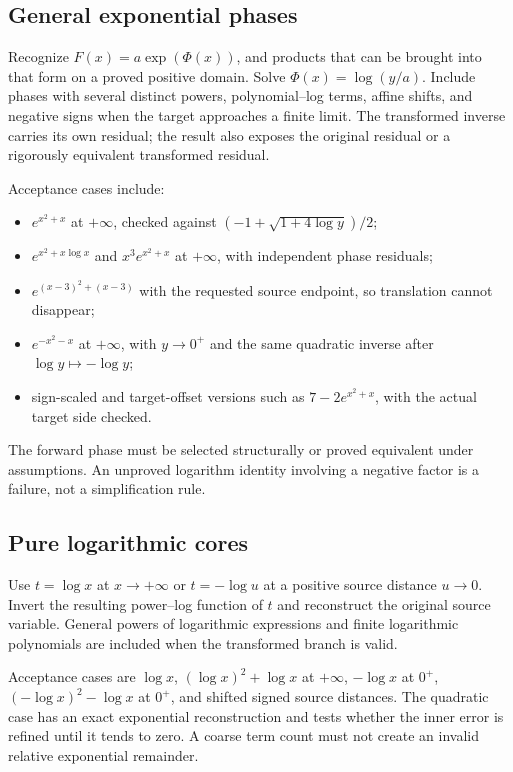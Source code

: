 \documentclass[11pt,a4paper]{article}
\begin{document}
\subsection{General exponential phases}

Recognize $F(x)=a\exp(\Phi(x))$, and products that can be brought into that form on a proved positive domain. Solve $\Phi(x)=\log(y/a)$. Include phases with several distinct powers, polynomial--log terms, affine shifts, and negative signs when the target approaches a finite limit. The transformed inverse carries its own residual; the result also exposes the original residual or a rigorously equivalent transformed residual.

Acceptance cases include:
\begin{itemize}[leftmargin=1.5em]
\item $e^{x^2+x}$ at $+\infty$, checked against $(-1+\sqrt{1+4\log y})/2$;
\item $e^{x^2+x\log x}$ and $x^3e^{x^2+x}$ at $+\infty$, with independent phase residuals;
\item $e^{(x-3)^2+(x-3)}$ with the requested source endpoint, so translation cannot disappear;
\item $e^{-x^2-x}$ at $+\infty$, with $y\to0^+$ and the same quadratic inverse after $\log y\mapsto-\log y$;
\item sign-scaled and target-offset versions such as $7-2e^{x^2+x}$, with the actual target side checked.
\end{itemize}

The forward phase must be selected structurally or proved equivalent under assumptions. An unproved logarithm identity involving a negative factor is a failure, not a simplification rule.

\subsection{Pure logarithmic cores}

Use $t=\log x$ at $x\to+\infty$ or $t=-\log u$ at a positive source distance $u\to0$. Invert the resulting power--log function of $t$ and reconstruct the original source variable. General powers of logarithmic expressions and finite logarithmic polynomials are included when the transformed branch is valid.

Acceptance cases are $\log x$, $(\log x)^2+\log x$ at $+\infty$, $-\log x$ at $0^+$, $(-\log x)^2-\log x$ at $0^+$, and shifted signed source distances. The quadratic case has an exact exponential reconstruction and tests whether the inner error is refined until it tends to zero. A coarse term count must not create an invalid relative exponential remainder.
\end{document}
